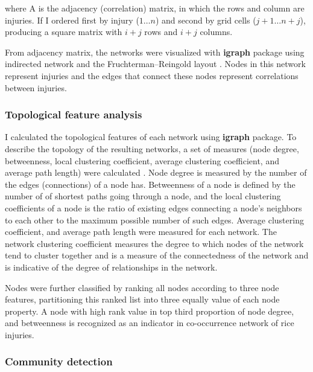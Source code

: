 where A is the adjacency (correlation) matrix, in which the rows and column are injuries. If I ordered first by injury ($1\dots n$) and second by grid cells ($j + 1\dots n + j$), producing a square matrix with $i + j$ rows and $i + j$ columns.

From adjacency matrix, the networks were visualized with \textbf{igraph} package \citep{Csardi_2010_igraph} using indirected network and the Fruchterman–Reingold layout \citep{Fruchterman_1991_Graph}. Nodes in this network represent injuries and the edges that connect these nodes represent correlations between injuries. 

\subsubsection{Topological feature analysis}

I calculated the topological features of each network using \textbf{igraph} package. To describe the topology of the resulting networks, a set of measures (node degree, betweenness, local clustering coefficient, average clustering coefficient, and average path length) were calculated \citep{Newman_2006_Modularity}. Node degree is measured by the number of the edges (connections) of a node has. Betweenness of a node is defined by the number of of shortest paths going through a node, and the local clustering coefficients of a node is the ratio of existing edges connecting a node's neighbors to each other to the maximum possible number of such edges. Average clustering coefficient, and average path length were measured for each network. The network clustering coefficient measures the degree to which nodes of the network tend to cluster together and is a measure of the connectedness of the network and is indicative of the degree of relationships in the network. 

Nodes were further classified by ranking all nodes according to three node features, partitioning this ranked list into three equally value of each node property. A node with high rank value in top third proportion of node degree, and betweenness is recognized as an indicator in co-occurrence network of rice injuries. 

\subsubsection{Community detection}

